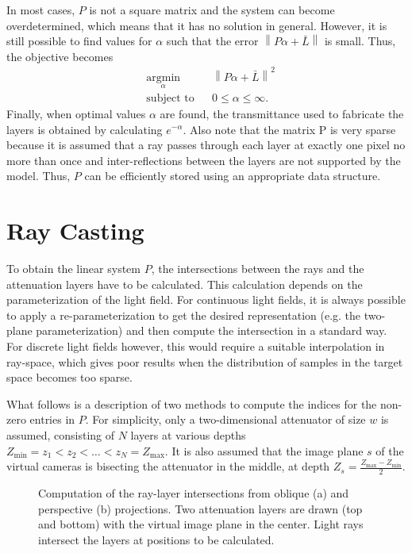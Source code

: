In most cases, $P$ is not a square matrix and the system can become overdetermined, which means that it has no solution in general.
However, it is still possible to find values for $\alpha$ such that the error $\left\lVert P \alpha + \bar{L} \right\rVert$ is small. 
Thus, the objective becomes
\begin{equation} \label{eq:minimize_norm}
	\begin{aligned}
		& \underset{\alpha}{\text{argmin}} 	& & \left\lVert P \alpha + \bar{L} \right\rVert ^2 \\
		& \text{subject to} 				& & 0 \leq \alpha \leq \infty.
	\end{aligned}
\end{equation}
Finally, when optimal values $\alpha$ are found, the transmittance used to fabricate the layers is obtained by calculating $e^{-\alpha}$.
Also note that the matrix P is very sparse because it is assumed that a ray passes through each layer at exactly one pixel no more than once and inter-reflections between the layers are not supported by the model.
Thus, $P$ can be efficiently stored using an appropriate data structure.

\section{Ray Casting}
\label{sec:ray_casting}

To obtain the linear system $P$, the intersections between the rays and the attenuation layers have to be calculated.
This calculation depends on the parameterization of the light field.
For continuous light fields, it is always possible to apply a re-parameterization to get the desired representation (e.g. the two-plane parameterization) and then compute the intersection in a standard way.
For discrete light fields however, this would require a suitable interpolation in ray-space, which gives poor results when the distribution of samples in the target space becomes too sparse.

What follows is a description of two methods to compute the indices for the non-zero entries in $P$. 
For simplicity, only a two-dimensional attenuator of size $w$ is assumed, consisting of $N$ layers at various depths 
$Z_{\text{min}} = z_1 < z_2 < \dots < z_N = Z_{\text{max}}$.
It is also assumed that the image plane $s$ of the virtual cameras is bisecting the attenuator in the middle, at depth 
$Z_s = \frac{Z_{\text{max}} - Z_{\text{min}}}{2}$.

\begin{figure}[htb]
	\centering
	\subfigure[]{
		\centering
		
		\label{fig:ray_casting_oblique_projection}
	}
	\hfill
	\subfigure[]{
		\centering
		
		\label{fig:ray_casting_perspective_projection}
	}
	\caption{Computation of the ray-layer intersections from oblique (a) and perspective (b) projections.
			 Two attenuation layers are drawn (top and bottom) with the virtual image plane in the center.
			 Light rays intersect the layers at positions to be calculated.}
\end{figure}

